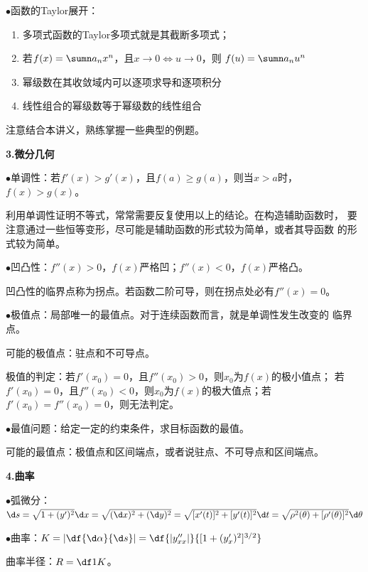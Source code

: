 $\bullet$函数的Taylor展开：
\begin{enumerate}[(1)]
  \setlength{\itemindent}{1cm}
  \item 多项式函数的Taylor多项式就是其截断多项式；
  \item 若$f(x)=\sumn a_nx^n$，且$x\to0\Leftrightarrow u\to0$，则
  $f(u)=\sumn a_nu^n$
  \item 幂级数在其收敛域内可以逐项求导和逐项积分
  \item 线性组合的幂级数等于幂级数的线性组合
\end{enumerate}

注意结合本讲义，熟练掌握一些典型的例题。

{\bf 3.微分几何}

$\bullet$单调性：若$f'(x)>g'(x)$，且$f(a)\geq g(a)$，则当$x>a$时，
$f(x)>g(x)$。

利用单调性证明不等式，常常需要反复使用以上的结论。在构造辅助函数时，
要注意通过一些恒等变形，尽可能是辅助函数的形式较为简单，或者其导函数
的形式较为简单。

$\bullet$凹凸性：$f''(x)>0$，$f(x)$严格凹；$f''(x)<0$，$f(x)$严格凸。

凹凸性的临界点称为拐点。若函数二阶可导，则在拐点处必有$f''(x)=0$。

$\bullet$极值点：局部唯一的最值点。对于连续函数而言，就是单调性发生改变的
临界点。

可能的极值点：驻点和不可导点。

极值的判定：若$f'(x_0)=0$，且$f''(x_0)>0$，则$x_0$为$f(x)$的极小值点；
若$f'(x_0)=0$，且$f''(x_0)<0$，则$x_0$为$f(x)$的极大值点；若
$f'(x_0)=f''(x_0)=0$，则无法判定。

$\bullet$最值问题：给定一定的约束条件，求目标函数的最值。

可能的最值点：极值点和区间端点，或者说驻点、不可导点和区间端点。

{\bf 4.曲率}

$\bullet$弧微分：$\d s=\sqrt{1+(y')^2}\d x =\sqrt{(\d x)^2+(\d y)^2}
=\sqrt{[x'(t)]^2+[y'(t)]^2}\d t=\sqrt{\rho^2(\theta)+[\rho'(\theta)]^2}\d\theta$

$\bullet$曲率：$K=\left|\df{\d\alpha}{\d s}\right|
=\df{|y''_{xx}|}{[1+(y'_x)^2]^{3/2}}$

曲率半径：$R=\df1K$。